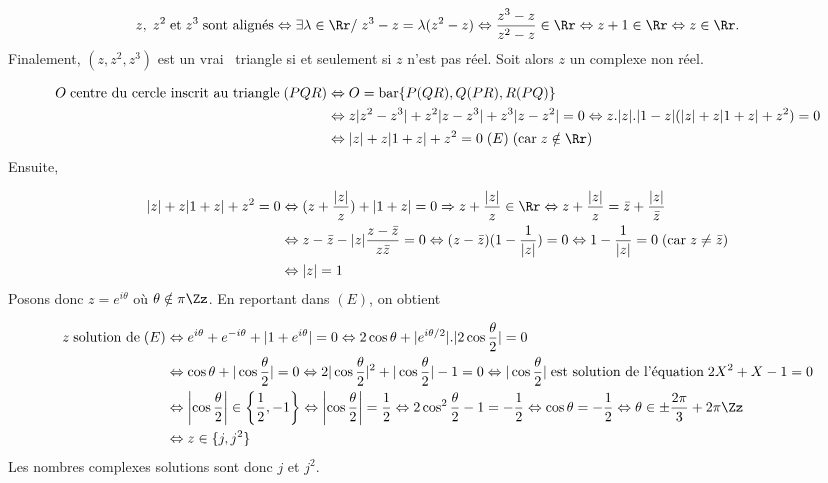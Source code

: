 {\begin{enumerate}
{$$z,\;z^2\;\mbox{et}\;z^3\;\mbox{sont
alignés}\Leftrightarrow\exists\lambda\in\Rr/\;z^3-z=\lambda(z^2-z)\Leftrightarrow\frac{z^3-z}{z^2-z}\in\Rr\Leftrightarrow z+1\in\Rr\Leftrightarrow z\in\Rr.$$
Finalement, $(z,z^2,z^3)$ est un \og vrai \fg~triangle si et seulement si $z$ n'est pas réel.
Soit alors $z$ un complexe non réel.

\begin{align*}
O\;\mbox{centre du cercle inscrit au triangle}\;(PQR)&\Leftrightarrow O=\mbox{bar}\{P(QR),Q(PR),R(PQ)\}\\
 &\Leftrightarrow z|z^2-z^3|+z^2|z-z^3|+z^3|z-z^2|=0
\Leftrightarrow z.|z|.|1-z|(|z|+z|1+z|+z^2)=0\\
 &\Leftrightarrow|z|+z|1+z|+z^2=0\;(E)\;(\mbox{car}\;z\notin\Rr)
\end{align*}
Ensuite,

\begin{align*}
|z|+z|1+z|+z^2=0&\Leftrightarrow(z+\frac{|z|}{z})+|1+z|=0\Rightarrow z+\frac{|z|}{z}\in\Rr\Leftrightarrow
z+\frac{|z|}{z}={\bar z}+\frac{|z|}{{\bar z}}\\
 &\Leftrightarrow z-{\bar z}-|z|\frac{z-{\bar z}}{z{\bar z}}=0\Leftrightarrow(z-{\bar z})(1-\frac{1}{|z|})=0
\Leftrightarrow1-\frac{1}{|z|}=0\;(\mbox{car}\;z\neq{\bar z})\\
 &\Leftrightarrow|z|= 1
\end{align*}
Posons donc $z=e^{i\theta}$ où $\theta\notin\pi\Zz$. En reportant dans $(E)$, on obtient

\begin{align*}
z\;\mbox{solution de}\;(E)&\Leftrightarrow e^{i\theta}+e^{-i\theta}+|1+e^{i\theta}|=
0\Leftrightarrow2\cos\theta+|e^{i\theta/2}|.|2\cos\frac{\theta}{2}|=0\\
 &\Leftrightarrow\cos\theta+|\cos\frac{\theta}{2}|=0\Leftrightarrow2|\cos\frac{\theta}{2}|^2+|\cos\frac{\theta}{2}|-1=0
\Leftrightarrow|\cos\frac{\theta}{2}|\;\text{est solution de l'équation}\;2X^2+X-1=0\\
 &\Leftrightarrow\left|\cos\frac{\theta}{2}\right|\in\left\{\frac{1}{2},-1\right\}\Leftrightarrow\left|\cos\frac{\theta}{2}\right|=\frac{1}{2}
\Leftrightarrow2\cos^2\frac{\theta}{2}-1=-\frac{1}{2}
\Leftrightarrow\cos\theta=-\frac{1}{2}\Leftrightarrow\theta\in\pm\frac{2\pi}{3}+2\pi\Zz\\
 &\Leftrightarrow
z\in\{j,j^2\}
\end{align*}
Les nombres complexes solutions sont donc $j$ et $j^2$.}
\end{enumerate}
}
